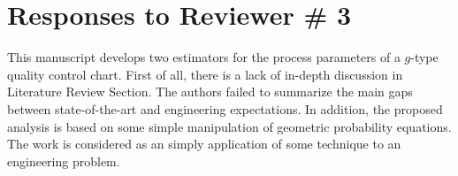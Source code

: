 \documentclass[10pt,a4paper]{article}
\begin{document}


\clearpage
\section*{\LARGE\centering Responses to Reviewer \# 3}
This manuscript develops two estimators for the process parameters of a $g$-type quality control chart.
First of all, there is a lack of in-depth discussion in Literature Review Section.
The authors failed to summarize the main gaps between state-of-the-art and engineering expectations.
In addition, the proposed analysis is based on some simple manipulation of geometric probability equations.
The work is considered as an simply application of some technique to an engineering problem.
\end{document}
